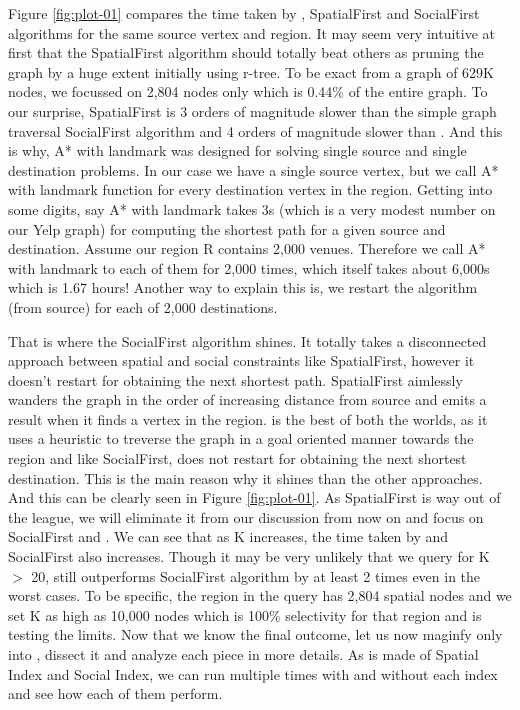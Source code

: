 Figure \ref{fig:plot-01} compares the time taken by {\rrp}, SpatialFirst and SocialFirst algorithms for the same source vertex and region. It may seem very intuitive at first that the SpatialFirst algorithm should totally beat others as pruning the graph by a huge extent initially using r-tree. To be exact from a graph of 629K nodes, we focussed on 2,804 nodes only which is 0.44\% of the entire graph. To our surprise, SpatialFirst is 3 orders of magnitude slower than the simple graph traversal SocialFirst algorithm and 4 orders of magnitude slower than {\rrp}. And this is why, A* with landmark was designed for solving single source and single destination problems. In our case we have a single source vertex, but we call A* with landmark function for every destination vertex in the region. Getting into some digits, say A* with landmark takes 3s (which is a very modest number on our Yelp graph) for computing the shortest path for a given source and destination. Assume our region R contains 2,000 venues. Therefore we call A* with landmark to each of them for 2,000 times, which itself takes about 6,000s which is 1.67 hours! Another way to explain this is, we restart the algorithm (from source) for each of 2,000 destinations.

That is where the SocialFirst algorithm shines. It totally takes a disconnected approach between spatial and social constraints like SpatialFirst, however it doesn't restart for obtaining the next shortest path. SpatialFirst aimlessly wanders the graph in the order of increasing distance from source and emits a result when it finds a vertex in the region. {\rrp} is the best of both the worlds, as it uses a heuristic to treverse the graph in a goal oriented manner towards the region and like SocialFirst, does not restart for obtaining the next shortest destination. This is the main reason why it shines than the other approaches. And this can be clearly seen in Figure \ref{fig:plot-01}. As SpatialFirst is way out of the league, we will eliminate it from our discussion from now on and focus on SocialFirst and {\rrp}. We can see that as K increases, the time taken  by {\rrp} and SocialFirst also increases. Though it may be very unlikely that we query for K $>$ 20, {\rrp} still outperforms SocialFirst algorithm by at least 2 times even in the worst cases. To be specific, the region in the query has 2,804 spatial nodes and we set K as high as 10,000 nodes which is 100\% selectivity for that region and is testing the limits. Now that we know the final outcome, let us now maginfy only into {\rrp}, dissect it and analyze each piece in more details. As {\rrp} is made of Spatial Index and Social Index, we can run {\rrp} multiple times with and without each index and see how each of them perform.

